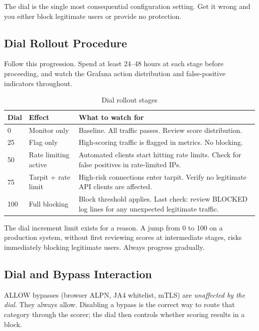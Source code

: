 The dial is the single most consequential configuration setting. Get it wrong and
you either block legitimate users or provide no protection.

\subsection{Dial Rollout Procedure}

Follow this progression. Spend at least 24--48 hours at each stage before proceeding,
and watch the Grafana action distribution and false-positive indicators throughout.

\begin{table}[ht]
  \small
  \begin{tabularx}{\linewidth}{llX}
    \toprule
    \textbf{Dial} & \textbf{Effect} & \textbf{What to watch for} \\
    \midrule
    0 & Monitor only & Baseline. All traffic passes. Review score distribution. \\
    25 & Flag only & High-scoring traffic is flagged in metrics. No blocking. \\
    50 & Rate limiting active & Automated clients start hitting rate limits. Check
         for false positives in rate-limited IPs. \\
    75 & Tarpit + rate limit & High-risk connections enter tarpit. Verify no
         legitimate API clients are affected. \\
    100 & Full blocking & Block threshold applies. Last check: review BLOCKED log
         lines for any unexpected legitimate traffic. \\
    \bottomrule
  \end{tabularx}
  \caption{Dial rollout stages}
\end{table}

\begin{dangerbox}[Do not jump to dial=100]
The dial increment limit exists for a reason. A jump from 0 to 100 on a production
system, without first reviewing scores at intermediate stages, risks immediately
blocking legitimate users. Always progress gradually.
\end{dangerbox}

\subsection{Dial and Bypass Interaction}

ALLOW bypasses (browser ALPN, JA4 whitelist, mTLS) are \emph{unaffected by the dial}.
They always allow. Disabling a bypass is the correct way to route that category
through the scorer; the dial then controls whether scoring results in a block.

